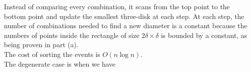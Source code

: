 Instead of comparing every combination, it scans from the top point to the bottom point and update the smallest three-disk at each step. At each step, the number of combinations needed to find a new diameter is a constant because the numbers of points inside the rectangle of size $2 \delta \times \delta$ is bounded by a constant, as being proven in part (a). \\

The cost of sorting the events is $O(n\log n)$. \\

The degenerate case is when we have  
